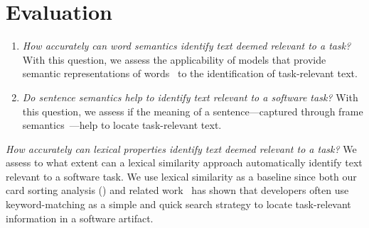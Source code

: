 \section{Evaluation}
\label{cp5:evaluation}




\begin{enumerate}[label=\textit{RQ\arabic*}]
    \item \textit{How accurately can word semantics identify text deemed relevant to a task?}
    With this question, we assess the applicability of models that provide semantic representations of words~\cite{Mikolov2013, Devlin2018Bert}  to the identification of  task-relevant text.
    
    
    \item \textit{Do sentence semantics help to identify text relevant to a software task?}
    With this question, we assess if the meaning of a sentence---captured through frame semantics~\cite{fillmore1976frame}---help to locate task-relevant text.
\end{enumerate}
    


\textit{How accurately can lexical properties identify text deemed relevant to a task?}
    We assess to what extent can a lexical similarity approach automatically identify text relevant to a software task.
    We use lexical similarity as a baseline since both our card sorting analysis () and related work~\cite{Ko2006a, Freund2015} has shown
    that developers often use keyword-matching as a simple and quick search strategy to locate task-relevant information in a software artifact.












